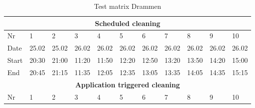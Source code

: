 \begin{table}[H]
\small
\centering
\caption{Test matrix Drammen}
\label{tab:TestMatrixEnv2}
\begin{tabular}{|lllllllllll|}
\hline
\multicolumn{11}{|c|}{\textbf{Scheduled cleaning}}                                                                                                                                                                                                                                                        \\ \hline
\multicolumn{1}{|l|}{Nr} & \multicolumn{1}{l|}{1}     & \multicolumn{1}{l|}{2}     & \multicolumn{1}{l|}{3}     & \multicolumn{1}{l|}{4}     & \multicolumn{1}{l|}{5}     & \multicolumn{1}{l|}{6}     & \multicolumn{1}{l|}{7}     & \multicolumn{1}{l|}{8}     & \multicolumn{1}{l|}{9}     & 10    \\ \hline
\multicolumn{1}{|l|}{Date}   & \multicolumn{1}{l|}{25.02} & \multicolumn{1}{l|}{25.02} & \multicolumn{1}{l|}{26.02} & \multicolumn{1}{l|}{26.02} & \multicolumn{1}{l|}{26.02} & \multicolumn{1}{l|}{26.02} & \multicolumn{1}{l|}{26.02} & \multicolumn{1}{l|}{26.02} & \multicolumn{1}{l|}{26.02} & 26.02 \\ \hline
\multicolumn{1}{|l|}{Start}  & \multicolumn{1}{l|}{20:30} & \multicolumn{1}{l|}{21:00} & \multicolumn{1}{l|}{11:20} & \multicolumn{1}{l|}{11:50} & \multicolumn{1}{l|}{12:20} & \multicolumn{1}{l|}{12:50} & \multicolumn{1}{l|}{13:20} & \multicolumn{1}{l|}{13:50} & \multicolumn{1}{l|}{14:20} & 15:00 \\ \hline
\multicolumn{1}{|l|}{End}    & \multicolumn{1}{l|}{20:45} & \multicolumn{1}{l|}{21:15} & \multicolumn{1}{l|}{11:35} & \multicolumn{1}{l|}{12:05} & \multicolumn{1}{l|}{12:35} & \multicolumn{1}{l|}{13:05} & \multicolumn{1}{l|}{13:35} & \multicolumn{1}{l|}{14:05} & \multicolumn{1}{l|}{14:35} & 15:15 \\ \hline
\multicolumn{11}{|c|}{\textbf{Application triggered cleaning}}                                                                                                                                                                                                                                            \\ \hline
\multicolumn{1}{|l|}{Nr} & \multicolumn{1}{l|}{1}     & \multicolumn{1}{l|}{2}     & \multicolumn{1}{l|}{3}     & \multicolumn{1}{l|}{4}     & \multicolumn{1}{l|}{5}     & \multicolumn{1}{l|}{6}     & \multicolumn{1}{l|}{7}     & \multicolumn{1}{l|}{8}     & \multicolumn{1}{l|}{9}     & 10    \\ \hline

\end{tabular}
\end{table}
